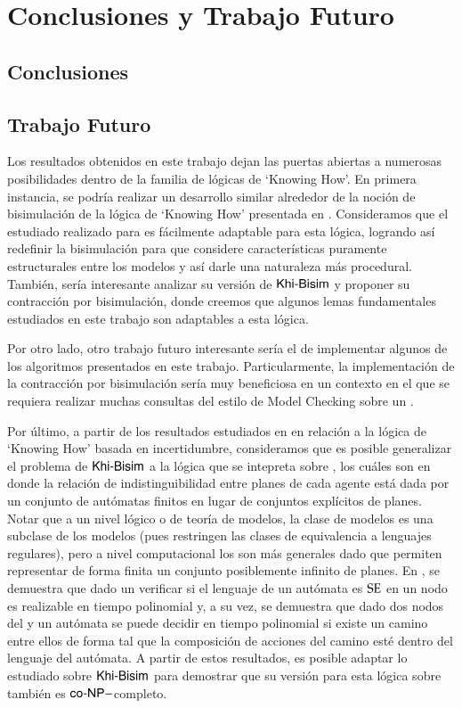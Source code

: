 \chapter{Conclusiones y Trabajo Futuro}

\section{Conclusiones}


\section{Trabajo Futuro}

Los resultados obtenidos en este trabajo dejan las puertas abiertas a numerosas posibilidades dentro de la familia de lógicas de `Knowing How'. 
En primera instancia, se podría realizar un desarrollo similar alrededor de la noción de bisimulación de la lógica de `Knowing How' presentada 
en \cite{Wang15KH,Wang2018GoalDirectedKH}. Consideramos que el estudiado realizado para \KHilogic es fácilmente adaptable para esta lógica, logrando 
así redefinir la bisimulación para que considere características puramente estructurales entre los modelos y así 
darle una naturaleza más procedural. También, sería interesante analizar su versión de $\rm\textsf{Khi-Bisim}$ y proponer su contracción por bisimulación, 
donde creemos que algunos lemas fundamentales estudiados en este trabajo son adaptables a esta lógica.

Por otro lado, otro trabajo futuro interesante sería el de implementar algunos de los algoritmos presentados en este trabajo. Particularmente, 
la implementación de la contracción por bisimulación sería muy beneficiosa en un contexto en el que se requiera realizar muchas consultas del 
estilo de Model Checking sobre un \ults.

Por último, a partir de los resultados estudiados en \cite{Demri_Fervari_2023} en relación a la lógica de `Knowing How' basada en incertidumbre, 
consideramos que es posible generalizar el problema de $\rm\textsf{Khi-Bisim}$ a la lógica que se intepreta sobre \regults, los cuáles son \ults en donde la relación 
de indistinguibilidad entre planes de cada agente está dada por un conjunto de autómatas finitos en lugar de conjuntos explícitos de planes. Notar que 
a un nivel lógico o de teoría de modelos, la clase de modelos \regults es una subclase de los modelos \ults (pues restringen las clases de equivalencia 
a lenguajes regulares), pero a nivel computacional los \regults son más generales dado que permiten representar de forma finita un conjunto 
posiblemente infinito de planes. En \cite{Demri_Fervari_2023}, se demuestra que dado un \regults verificar si el lenguaje de un autómata 
es $\mathrm{SE}$ en un nodo es realizable en tiempo polinomial y, a su vez, se demuestra que dado dos nodos del \regults y un autómata se puede 
decidir en tiempo polinomial si existe un camino entre ellos de forma tal que la composición de acciones del camino esté dentro del 
lenguaje del autómata. A partir de estos resultados, es posible adaptar lo estudiado sobre $\rm\textsf{Khi-Bisim}$ para demostrar que su versión para 
esta lógica sobre \regults también es $\rm\textsf{co-NP}-$completo.